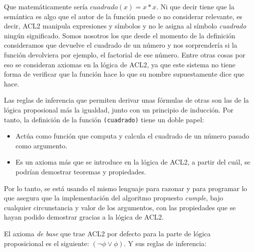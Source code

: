 \documentclass[a4paper,10pt]{article}
\begin{document}
Que matemáticamente sería $cuadrado(x) = x * x$. Ni que decir tiene que la semántica es algo que el autor de la función puede o no considerar relevante, es decir, ACL2 manipula expresiones y símbolos y no le asigna al símbolo \emph{cuadrado} ningún significado. Somos nosotros los que desde el momento de la definición consideramos que devuelve el cuadrado de un número y nos sorprendería si la función devolviera por ejemplo, el factorial de ese número. Entre otras cosas por eso se consideran axiomas en la lógica de ACL2, ya que este sistema no tiene forma de verificar que la función hace lo que su nombre supuestamente dice que hace. 

\par\vspace{10pt}

Las reglas de inferencia que permiten derivar unas fórmulas de otras son las de la lógica proposional más la igualdad, junto con un principio de inducción. Por tanto, la definición de la función \texttt{(cuadrado)} tiene un doble papel:

\par\vspace{10pt}

\begin{itemize}
	\item Actúa como función que computa y calcula el cuadrado de un número pasado como argumento.
	\item Es un axioma más que se introduce en la lógica de ACL2, a partir del cuál, se podrían demostrar teoremas y propiedades.
\end{itemize}

\par\vspace{10pt}

Por lo tanto, se está usando el mismo lenguaje para razonar y para programar lo que asegura que la implementación del algoritmo propuesto \emph{cumple}, bajo cualquier circunstancia y valor de los argumentos, con las propiedades que se hayan podido demostrar gracias a la lógica de ACL2.

\par\vspace{10pt}

El axioma \emph{de base} que trae ACL2 por defecto para la parte de lógica proposicional es el siguiente: $(\neg\phi\vee\phi)$. Y sus reglas de inferencia:

\par\vspace{10pt}
\end{document}
